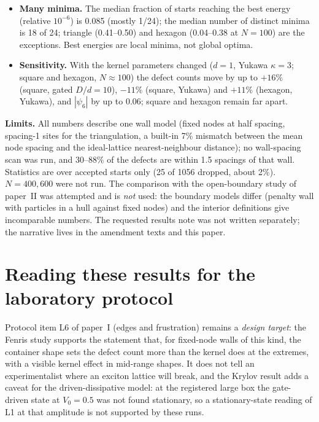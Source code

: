 \documentclass[11pt,a4paper]{article}
\begin{document}
\begin{itemize}[leftmargin=1.2em,itemsep=1pt]
all 1031 accepted states (0 failures); this is an identity for any conforming triangulation, so the gate tests the code, not the physics,
and $k_b$ itself depends on the state (a standard deviation of $Q$ up to 1.3 within a case). Mean $Q$: hexagon $-4$, triangle $-3.5$, disc $-1.6$,
annulus $-4.6$, maze $+5.7$, rectangles about 0.
\item \textbf{Many minima.} The median fraction of starts reaching the best energy (relative $10^{-6}$) is 0.085 (mostly 1/24); the median
number of distinct minima is 18 of 24; triangle (0.41--0.50) and hexagon (0.04--0.38 at $N=100$) are the exceptions. Best energies are local minima,
not global optima.
\item \textbf{Sensitivity.} With the kernel parameters changed ($d=1$, Yukawa $\kappa=3$; square and hexagon, $N\approx100$) the defect counts move by up to $+16\%$ (square, gated $D/d=10$), $-11\%$ (square, Yukawa) and $+11\%$ (hexagon, Yukawa), and
$|\psi_6|$ by up to 0.06; square and hexagon remain far apart.
\end{itemize}

\textbf{Limits.} All numbers describe one wall model (fixed nodes at half spacing, spacing-1 sites for the triangulation, a built-in 7\%
mismatch between the mean node spacing and the ideal-lattice nearest-neighbour distance); no wall-spacing scan was run, and
$30$--$88\%$ of the defects are within 1.5 spacings of that wall. Statistics are over accepted starts only (25 of 1056 dropped, about 2\%). $N=400,600$ were not run. The
comparison with the open-boundary study of paper~II was attempted and is \emph{not} used: the boundary models differ (penalty wall with
particles in a hull against fixed nodes) and the interior definitions give incomparable numbers. The requested results note was not
written separately; the narrative lives in the amendment texts and this paper.

\section{Reading these results for the laboratory protocol}\label{sec:protocol}

Protocol item L6 of paper~I (edges and frustration) remains a \emph{design target}: the Fenris study supports the statement that, for
fixed-node walls of this kind, the container shape sets the defect count more than the kernel does at the extremes, with a visible kernel effect in mid-range shapes. It does not tell an experimentalist where an exciton lattice will break, and the Krylov
result adds a caveat for the driven-dissipative model: at the registered large box the gate-driven state at $V_0=0.5$ was not found stationary,
so a stationary-state reading of L1 at that amplitude is not supported by these runs.
\end{document}
